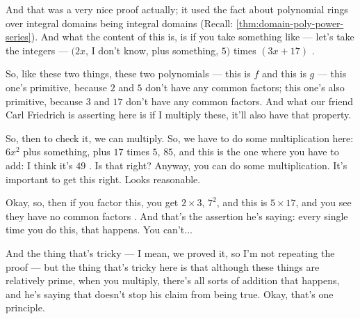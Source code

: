 \begin{speech}[00:08:38 - 00:10:17]
And that was a very nice proof actually; it used the fact about polynomial rings over integral domains being integral domains (Recall: \cref{thm:domain-poly-power-series}). And what the content of this is, is if you take something like --- let's take the integers --- $(2x$, I don't know, plus something, $5)$ times $(3x + 17)$ .

So, like these two things, these two polynomials --- this is $f$ and this is $g$  --- this one's primitive, because $2$ and $5$ don't have any common factors; this one's also primitive, because $3$ and $17$ don't have any common factors. And what our friend Carl Friedrich is asserting here is if I multiply these, it'll also have that property.

So, then to check it, we can multiply. So, we have to do some multiplication here: $6x^2$ plus something, plus $17$ times $5$, $85$, and this is the one where you have to add: I think it's $49$ . Is that right? Anyway, you can do some multiplication. It's important to get this right. Looks reasonable.

Okay, so, then if you factor this, you get $2 \times 3$, $7^2$, and this is $5 \times 17$, and you see they have no common factors . And that's the assertion he's saying: every single time you do this, that happens. You can't...

And the thing that's tricky --- I mean, we proved it, so I'm not repeating the proof --- but the thing that's tricky here is that although these things are relatively prime, when you multiply, there's all sorts of addition that happens, and he's saying that doesn't stop his claim from being true. Okay, that's one principle.
\end{speech}

\begin{content}
\end{content}

